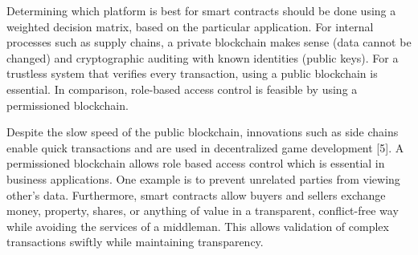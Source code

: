 \documentclass[12pt]{scrreprt}
\begin{document}
\begin{appendices}


Determining which platform is best for smart contracts should be done using a weighted decision matrix, based on the particular application. For internal processes such as supply chains, a private blockchain makes sense (data cannot be changed) and cryptographic auditing with known identities (public keys). For a trustless system that verifies every transaction, using a public blockchain is essential. In comparison, role-based access control is feasible by using a permissioned blockchain. \hfill \break

Despite the slow speed of the public blockchain, innovations such as side chains enable quick transactions and are used in decentralized game development [5]. A permissioned blockchain allows role based access control which is essential in business applications. One example is to prevent unrelated parties from viewing other's data. 	Furthermore, smart contracts allow buyers and sellers exchange money, property, shares, or anything of value in a transparent, conflict-free way while avoiding the services of a middleman. This allows validation of complex transactions swiftly while maintaining transparency.


\end{appendices}
\end{document}

